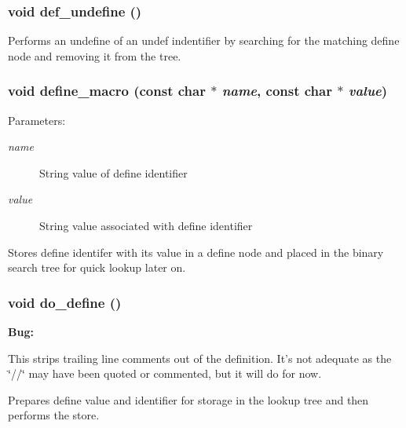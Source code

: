\subsubsection{\setlength{\rightskip}{0pt plus 5cm}void def\_\-undefine ()\hspace{0.3cm}{\tt  [static]}}\label{lexer_8c_a144}


Performs an undefine of an undef indentifier by searching for the matching define node and removing it from the tree. 
\subsubsection{\setlength{\rightskip}{0pt plus 5cm}void define\_\-macro (const char $\ast$ {\em name}, const char $\ast$ {\em value})}\label{lexer_8c_a153}


\begin{Desc}
\item[Parameters: ]\par
\begin{description}
\item[{\em 
name}]String value of define identifier \item[{\em 
value}]String value associated with define identifier\end{description}
\end{Desc}
Stores define identifer with its value in a define node and placed in the binary search tree for quick lookup later on. 
\subsubsection{\setlength{\rightskip}{0pt plus 5cm}void do\_\-define ()\hspace{0.3cm}{\tt  [static]}}\label{lexer_8c_a145}




\begin{Desc}
\item[{\bf Bug: }]\par
This strips trailing line comments out of the definition. It's not adequate as the \char`\"{}//\char`\"{} may have been quoted or commented, but it will do for now.\end{Desc}


Prepares define value and identifier for storage in the lookup tree and then performs the store. 

